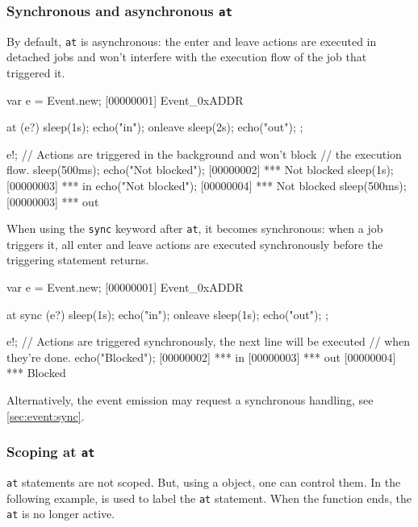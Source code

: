 \subsubsection{Synchronous and asynchronous \lstinline'at'}
\label{sec:lang:at:sync-async}

By default, \lstinline{at} is asynchronous: the enter and leave actions are
executed in detached jobs and won't interfere with the execution flow of the
job that triggered it.

\begin{urbiscript}[firstnumber=1]
var e = Event.new;
[00000001] Event_0xADDR

at (e?)
{
  sleep(1s);
  echo("in");
}
onleave
{
  sleep(2s);
  echo("out");
};

e!;
// Actions are triggered in the background and won't block
// the execution flow.
sleep(500ms);
echo("Not blocked");
[00000002] *** Not blocked
sleep(1s);
[00000003] *** in
echo("Not blocked");
[00000004] *** Not blocked
sleep(500ms);
[00000003] *** out
\end{urbiscript}

When using the \lstinline{sync} keyword after \lstinline{at}, it becomes
synchronous: when a job triggers it, all enter and leave actions are
executed synchronously before the triggering statement returns.

\begin{urbiscript}[firstnumber=1]
var e = Event.new;
[00000001] Event_0xADDR

at sync (e?)
{
  sleep(1s);
  echo("in");
}
onleave
{
  sleep(1s);
  echo("out");
};

e!;
// Actions are triggered synchronously, the next line will be executed
// when they're done.
echo("Blocked");
[00000002] *** in
[00000003] *** out
[00000004] *** Blocked
\end{urbiscript}

Alternatively, the event emission may request a synchronous handling, see
\autoref{sec:event:sync}.

\subsubsection{Scoping at \lstinline'at'}

\lstinline'at' statements are not scoped.  But, using a 
object, one can control them.  In the following example,
 is used to label the \lstinline|at| statement.  When
the function ends, the \lstinline|at| is no longer active.

